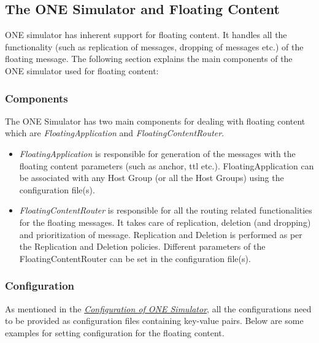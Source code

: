 \subsection{The ONE Simulator and Floating Content}
ONE simulator has inherent support for floating content. It handles all the functionality (such as replication of messages, dropping of messages etc.) of the floating message. The following section explains the main components of the ONE simulator used for floating content:

\subsubsection{Components}
The ONE Simulator has two main components for dealing with floating content which are \textit{FloatingApplication} and \textit{FloatingContentRouter}.

\begin{itemize}
\item \textit{FloatingApplication} is responsible for generation of the messages with the floating content parameters (such as anchor, ttl etc.). FloatingApplication can be associated with any Host Group (or all the Host Groups) using the configuration file(s).
\item \textit{FloatingContentRouter} is responsible for all the routing related functionalities for the floating messages. It takes care of replication, deletion (and dropping) and prioritization of message. Replication and Deletion is performed as per the Replication and Deletion policies. Different parameters of the FloatingContentRouter can be set in the configuration file(s).
\end{itemize}

\subsubsection{Configuration}
As mentioned in the \hyperref[one:configuration]{\emph{Configuration of ONE Simulator}}, all the configurations need to be provided as configuration files containing key-value pairs. Below are some examples for setting configuration for the floating content.

